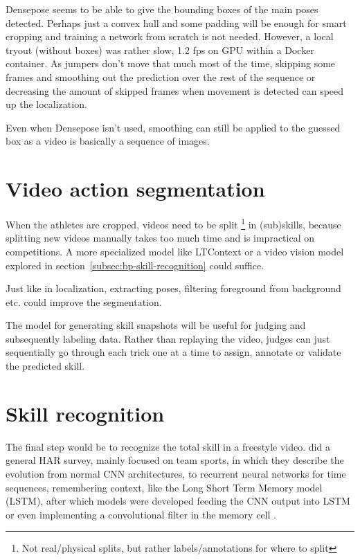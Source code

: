 Densepose seems to be able to give the bounding boxes of the main poses detected. Perhaps just a convex hull and some padding will be enough for smart cropping and training a network from scratch is not needed.
However, a local tryout (without boxes) was rather slow, 1.2 fps on GPU within a Docker container.
As jumpers don't move that much most of the time, skipping some frames and smoothing out the prediction over the rest of the sequence or decreasing the amount of skipped frames when movement is detected can speed up the localization.

Even when Densepose isn't used, smoothing can still be applied to the guessed box as a video is basically a sequence of images.


\section{Video action segmentation}

When the athletes are cropped, videos need to be split \footnote{Not real/physical splits, but rather labels/annotations for where to split} in (sub)skills, because splitting new videos manually takes too much time and is impractical on competitions. A more specialized model like LTContext \autocite{Jiaming_2023} or a video vision model explored in section~\ref{subsec:bp-skill-recognition} could suffice.

Just like in localization, extracting poses, filtering foreground from background etc. could improve the segmentation.

The model for generating skill snapshots will
be useful for judging and subsequently labeling
data. Rather than replaying the video, judges can
just sequentially go through each trick one at a
time to assign, annotate or validate the predicted
skill.




\section{Skill recognition}
\label{lit:skill-recognition}

The final step would be to recognize the total skill in a freestyle video.
\textcite{Yin_2024} did a general HAR survey, mainly focused on team sports, in which they describe the evolution from normal CNN architectures, to recurrent neural networks for time sequences, remembering context, like the Long Short Term Memory model (LSTM), after which models were developed feeding the CNN output into LSTM or even implementing a convolutional filter in the memory cell \autocite{Shi_2015}.

